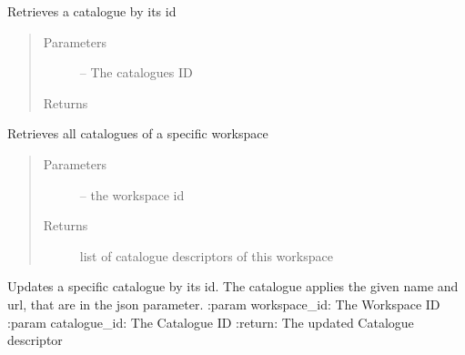 \documentclass[letterpaper,10pt,english]{sphinxmanual}
\begin{document}

\begin{fulllineitems}
\label{_source/son_editor.impl:son_editor.impl.cataloguesimpl.get_catalogue}
Retrieves a catalogue by its id
\begin{quote}\begin{description}
\item[{Parameters}] \leavevmode
{} -- The catalogues ID

\item[{Returns}] \leavevmode


\end{description}\end{quote}

\end{fulllineitems}


\begin{fulllineitems}
\label{_source/son_editor.impl:son_editor.impl.cataloguesimpl.get_catalogues}
Retrieves all catalogues of a specific workspace
\begin{quote}\begin{description}
\item[{Parameters}] \leavevmode
{} -- the workspace id

\item[{Returns}] \leavevmode
list of catalogue descriptors of this workspace

\end{description}\end{quote}

\end{fulllineitems}


\begin{fulllineitems}
\label{_source/son_editor.impl:son_editor.impl.cataloguesimpl.update_catalogue}
Updates a specific catalogue by its id. The catalogue
applies the given name and url, that are in the json parameter.
:param workspace\_id: The Workspace ID
:param catalogue\_id: The Catalogue ID
:return: The updated Catalogue descriptor

\end{fulllineitems}
\end{document}
